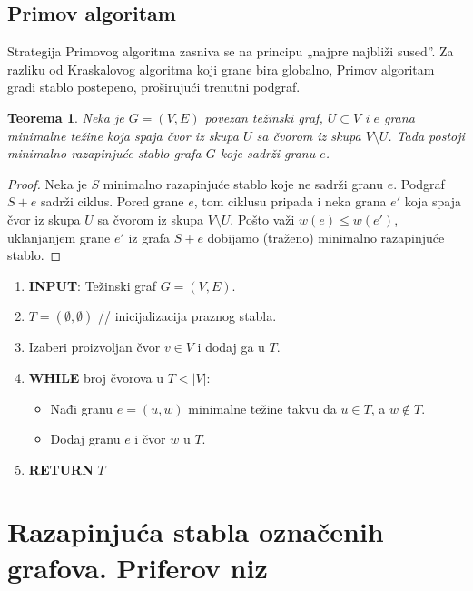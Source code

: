 \documentclass[a4paper,12pt]{article}
\numberwithin{algorithm}{section}
\theoremstyle{plain}
\newtheorem{theorem}{Teorema}[section]
\theoremstyle{definition}
\theoremstyle{remark}
\begin{document}
\subsection{Primov algoritam}
Strategija Primovog algoritma zasniva se na principu „najpre najbliži sused”. Za razliku od Kraskalovog algoritma koji grane bira globalno, Primov algoritam gradi stablo postepeno, proširujući trenutni podgraf.

\begin{theorem}
    Neka je $G = (V, E)$ povezan težinski graf, $U \subset V$ i $e$ grana minimalne težine koja spaja čvor iz skupa $U$ sa čvorom iz skupa $V \setminus U$. Tada postoji minimalno razapinjuće stablo grafa $G$ koje sadrži granu $e$.
\end{theorem}
\begin{proof}
    Neka je $S$ minimalno razapinjuće stablo koje ne sadrži granu $e$. Podgraf $S + e$ sadrži ciklus. Pored grane $e$, tom ciklusu pripada i neka grana $e'$ koja spaja čvor iz skupa $U$ sa čvorom iz skupa $V \setminus U$. Pošto važi $w(e) \le w(e')$, uklanjanjem grane $e'$ iz grafa $S + e$ dobijamo (traženo) minimalno razapinjuće stablo.
\end{proof}

\begin{algorithm}[ht]
    \caption{Primov algoritam}
    \begin{enumerate}
        \item \textbf{INPUT}: Težinski graf $G = (V, E)$.
        \item $T = (\emptyset, \emptyset)$ // inicijalizacija praznog stabla.
        \item Izaberi proizvoljan čvor $v \in V$ i dodaj ga u $T$.
        \item \textbf{WHILE} broj čvorova u $T < |V|$:
        \begin{itemize}
            \item Nađi granu $e = (u, w)$ minimalne težine takvu da $u \in T$, a $w \notin T$.
            \item Dodaj granu $e$ i čvor $w$ u $T$.
        \end{itemize}
        \item \textbf{RETURN} $T$
    \end{enumerate}
\end{algorithm}
\newpage
\section{Razapinjuća stabla označenih grafova. Priferov niz}
\end{document}
